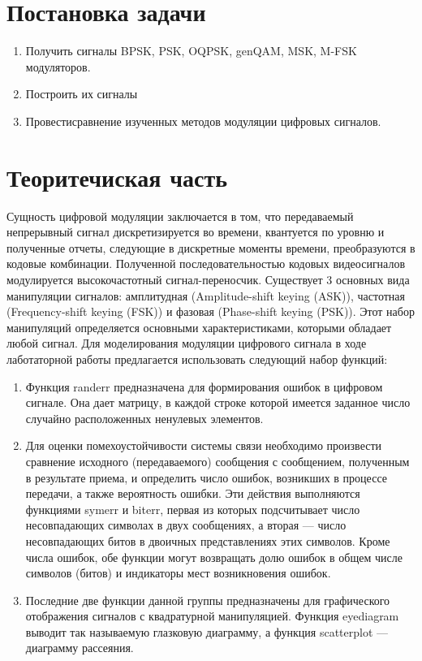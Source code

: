 \documentclass[10pt,a4paper]{report}
\begin{document}
\section{Постановка задачи}
\begin{enumerate}
\item 
Получить сигналы BPSK, PSK, OQPSK, genQAM, MSK, M-FSK модуляторов.
\item
Построить их сигналы
\item
Провестисравнение изученных методов модуляции цифровых сигналов.
\end{enumerate}
\section{Теоритечиская часть}
Сущность цифровой модуляции заключается в том, что передаваемый непрерывный сигнал дискретизируется во времени, квантуется по уровню и полученные отчеты, следующие в дискретные моменты времени, преобразуются в кодовые комбинации. Полученной последовательностью кодовых видеосигналов модулируется высокочастотный сигнал-переносчик.
Существует 3 основных вида манипуляции сигналов: амплитудная (Amplitude-shift keying (ASK)), частотная (Frequency-shift keying (FSK)) и фазовая (Phase-shift keying (PSK)). Этот набор манипуляций определяется основными характеристиками, которыми обладает любой сигнал. Для моделирования модуляции цифрового сигнала в ходе лаботаторной работы предлагается использовать следующий набор функций:
\begin{enumerate}
\item Функция randerr предназначена для формирования ошибок в цифровом сигнале. Она дает матрицу, в каждой строке которой имеется заданное число случайно расположенных ненулевых элементов.
\item Для оценки помехоустойчивости системы связи необходимо произвести сравнение исходного (передаваемого) сообщения с сообщением, полученным в результате приема, и определить число ошибок, возникших в процессе передачи, а также вероятность ошибки. Эти действия выполняются функциями symerr и biterr, первая из которых подсчитывает число несовпадающих символах в двух сообщениях, а вторая — число несовпадающих битов в двоичных представлениях этих символов. Кроме числа ошибок, обе функции могут возвращать долю ошибок в общем числе символов (битов) и индикаторы мест возникновения ошибок.
\item Последние две функции данной группы предназначены для графического отображения сигналов с квадратурной манипуляцией. Функция eyediagram выводит так называемую глазковую диаграмму, а функция scatterplot — диаграмму рассеяния.
\end{enumerate}
\end{document}
